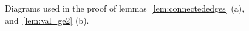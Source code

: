 \documentclass[11pt]{article}
\begin{document}
\begin{figure}[htbp]
   \centering
	\quad\quad\quad
   \caption{Diagrams used in the proof of lemmas~\ref{lem:connectededges} (a), 
   			and~\ref{lem:val_ge2} (b).}
\end{figure}
\end{document}
